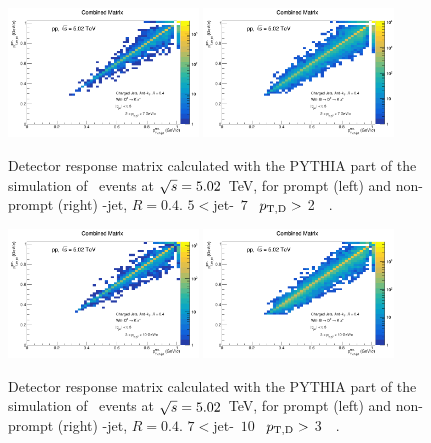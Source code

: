 \begin{figure}[bth]
\centering
\includegraphics[width=0.45\textwidth]{pp_2sig/response/R04/ProdMatrix_Jet5_7_Dpt2_7}
\includegraphics[width=0.45\textwidth]{pp_2sig/response/R04/ProdMatrixFD_Jet5_7_Dpt2_7}
\caption{Detector response matrix calculated with the PYTHIA part of the simulation of \pp\ events at $\sqrt{s}=5.02$~TeV, for prompt (left) and non-prompt (right) \Dzero-jet, $R=0.4$. $5<$jet-\pt\, $7$ \GeVc\, $p_{\mathrm{T,D}} > $ 2~\GeVc\ .}
\label{fig:fRMdet_pp_Dzero_5_7_R4}
\end{figure}

\begin{figure}[bth]
\centering
\includegraphics[width=0.45\textwidth]{pp_2sig/response/R04/ProdMatrix_Jet7_10_Dpt3_10}
\includegraphics[width=0.45\textwidth]{pp_2sig/response/R04/ProdMatrixFD_Jet7_10_Dpt3_10}
\caption{Detector response matrix calculated with the PYTHIA part of the simulation of \pp\ events at $\sqrt{s}=5.02$~TeV, for prompt (left) and non-prompt (right) \Dzero-jet, $R=0.4$. $7<$jet-\pt\, $10$ \GeVc\, $p_{\mathrm{T,D}} > $ 3~\GeVc\ .}
\label{fig:fRMdet_pp_Dzero_7_10_R4}
\end{figure}

